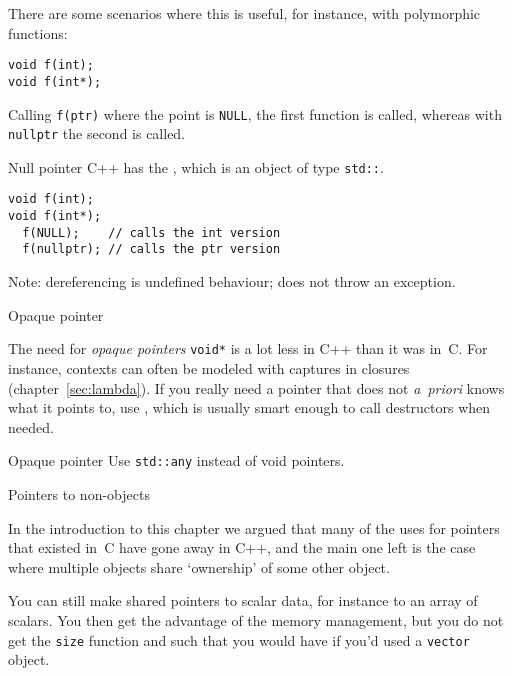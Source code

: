 There are some scenarios where this is useful, for instance, with
polymorphic functions:
\begin{lstlisting}
void f(int);
void f(int*);
\end{lstlisting}
Calling \lstinline{f(ptr)} where the point is \lstinline{NULL}, the first function is
called, whereas with \lstinline{nullptr} the second is called.

\begin{slide}{Null pointer}
  \label{sl:cpp-nullptr}
  C++ has the , which is an object of type
  \lstinline{std::}.

\begin{lstlisting}
void f(int);
void f(int*);
  f(NULL);    // calls the int version
  f(nullptr); // calls the ptr version
\end{lstlisting}
Note: dereferencing is undefined behaviour; does not throw an exception.
\end{slide}

 {Opaque pointer}

The need for \emph{opaque pointers}
\lstinline{void*}
is a lot less in C++ than it was in~C. For
instance, contexts can often be modeled with captures in closures
(chapter~\ref{sec:lambda}). If you really need a pointer that does not
\textit{a~priori} knows what it points to, use ,
which is usually smart enough to call destructors when needed.


\begin{slide}{Opaque pointer}
  \label{sl:void-ptr}
  Use \lstinline{std::any} instead of void pointers.

\end{slide}

 {Pointers to non-objects}

In the introduction to this chapter we argued that many of the uses
for pointers that existed in~C have gone away in C++, and the main one
left is the case where multiple objects share `ownership' of some
other object.

You can still make shared pointers to scalar data, for instance to an
array of scalars. You then get the advantage of the memory management,
but you do not get the \lstinline{size} function and such that you would have
if you'd used a \lstinline{vector} object.

